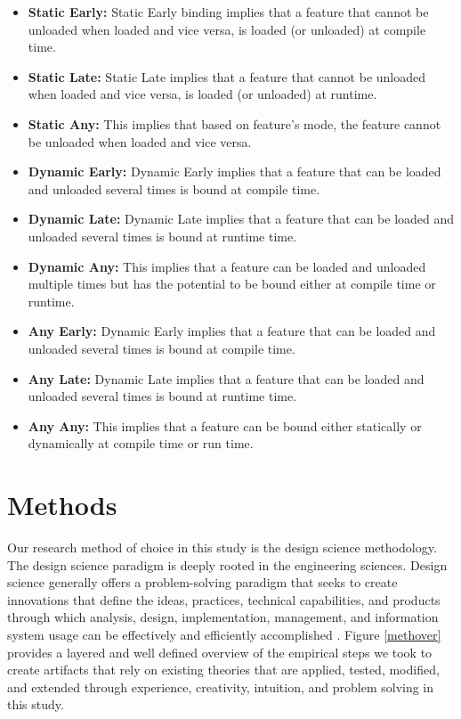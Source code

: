 \documentclass[conference]{IEEEtran}
\begin{document}
\begin{itemize}
    
    \item \textbf{Static Early: } Static Early binding implies that a feature that cannot be unloaded when loaded and vice versa, is loaded (or unloaded) at compile time. 
    
    \item \textbf{Static Late: } Static Late implies that a feature that cannot be unloaded when loaded and vice versa, is loaded (or unloaded) at runtime.
    
    \item \textbf{Static Any: } This implies that based on feature's mode, the feature cannot be unloaded when loaded and vice versa.  
    
    \item \textbf{Dynamic Early: }Dynamic Early implies that a feature that can be loaded and unloaded several times is bound at compile time.
    
    \item \textbf{Dynamic Late: }Dynamic Late implies that a feature that can be loaded and unloaded several times is bound at runtime time.
    
    \item \textbf{Dynamic Any: } This implies that a feature can be loaded and unloaded multiple times but has the potential to be bound either at compile time or runtime.
    
    \item \textbf{Any Early: }Dynamic Early implies that a feature that can be loaded and unloaded several times is bound at compile time.
    
    \item \textbf{Any Late: }Dynamic Late implies that a feature that can be loaded and unloaded several times is bound at runtime time.
    
    \item \textbf{Any Any: } This implies that a feature can be bound either statically or dynamically at compile time or run time. 
    
\end{itemize}

\section{Methods}
Our research method of choice in this study is the design science methodology. The design science paradigm is deeply rooted in the engineering sciences. Design science generally offers a problem-solving paradigm that seeks to create innovations that define the ideas, practices, technical capabilities, and products through which analysis, design, implementation, management, and information system usage can be effectively and efficiently accomplished  \cite{des-res}. Figure \ref{methover} provides a layered and well defined overview of the empirical steps we took to create artifacts that rely on existing theories that are applied, tested, modified, and extended through experience, creativity, intuition, and problem solving in this study. 
\end{document}
